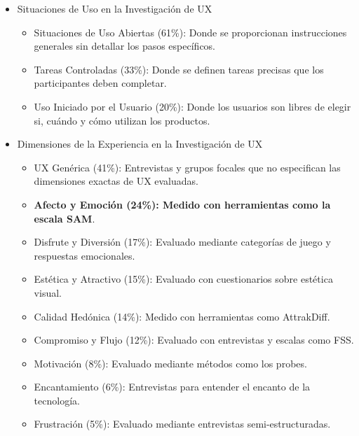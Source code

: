 \begin{itemize}
\begin{itemize}
    \item Situaciones de Uso en la Investigación de UX
    \begin{itemize}
        \item Situaciones de Uso Abiertas (61\%): Donde se proporcionan instrucciones generales sin detallar los pasos específicos.
        \item Tareas Controladas (33\%): Donde se definen tareas precisas que los participantes deben completar.
        \item Uso Iniciado por el Usuario (20\%): Donde los usuarios son libres de elegir si, cuándo y cómo utilizan los productos.
    \end{itemize}

    \item Dimensiones de la Experiencia en la Investigación de UX
    \begin{itemize}
        \item UX Genérica (41\%): Entrevistas y grupos focales que no especifican las dimensiones exactas de UX evaluadas.
        \item  \textbf{Afecto y Emoción (24\%): Medido con herramientas como la escala SAM}.
        \item Disfrute y Diversión (17\%): Evaluado mediante categorías de juego y respuestas emocionales.
        \item  Estética y Atractivo (15\%): Evaluado con cuestionarios sobre estética visual.
        \item Calidad Hedónica (14\%): Medido con herramientas como AttrakDiff.
        \item Compromiso y Flujo (12\%): Evaluado con entrevistas y escalas como FSS.
        \item Motivación (8\%): Evaluado mediante métodos como los probes.
        \item Encantamiento (6\%): Entrevistas para entender el encanto de la tecnología.
        \item Frustración (5\%): Evaluado mediante entrevistas semi-estructuradas.
    \end{itemize}


\end{itemize}
\end{itemize}
